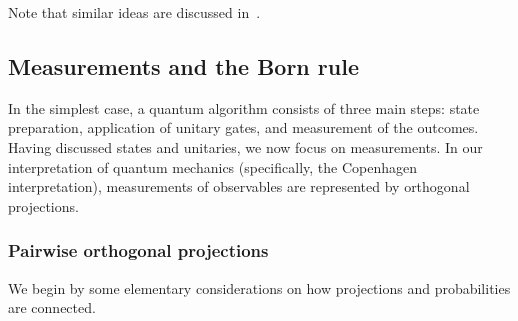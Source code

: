 \documentclass[a4paper, oneside, 12pt]{amsart}
\begin{document}
Note that similar ideas are discussed in~\cite{lloyd1995:AlmostAnyLogicGateUniversal}.

\subsection{Measurements and the Born rule}\label{sec:measurements-and-the-born-rule}
In the simplest case, a quantum algorithm consists of three main steps: state preparation, application of unitary gates, and measurement of the outcomes. Having discussed states and unitaries, we now focus on measurements.
In our interpretation of quantum mechanics (specifically, the Copenhagen interpretation), measurements of observables are represented by orthogonal projections.

\subsubsection{Pairwise orthogonal projections}\label{sec:pairwise-orthogonal-projections}

We begin by some elementary considerations on how projections and probabilities are connected.
\end{document}
